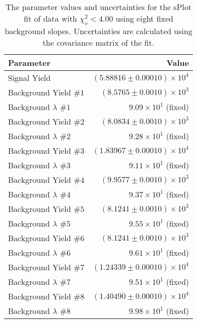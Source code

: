 
\begin{table}[ht]
    \begin{center}
        \begin{tabular}{lr}\toprule
            Parameter & Value \\\midrule
            Signal Yield & $(5.88816 \pm 0.00010) \times 10^{4}$ \\
            Background Yield $\#1$ & $(8.5765 \pm 0.0010) \times 10^{3}$ \\
            Background $\lambda$ $\#1$ & $9.09 \times 10^{1}$ (fixed) \\
            Background Yield $\#2$ & $(8.0834 \pm 0.0010) \times 10^{3}$ \\
            Background $\lambda$ $\#2$ & $9.28 \times 10^{1}$ (fixed) \\
            Background Yield $\#3$ & $(1.83967 \pm 0.00010) \times 10^{4}$ \\
            Background $\lambda$ $\#3$ & $9.11 \times 10^{1}$ (fixed) \\
            Background Yield $\#4$ & $(9.9577 \pm 0.0010) \times 10^{3}$ \\
            Background $\lambda$ $\#4$ & $9.37 \times 10^{1}$ (fixed) \\
            Background Yield $\#5$ & $(8.1241 \pm 0.0010) \times 10^{3}$ \\
            Background $\lambda$ $\#5$ & $9.55 \times 10^{1}$ (fixed) \\
            Background Yield $\#6$ & $(8.1241 \pm 0.0010) \times 10^{3}$ \\
            Background $\lambda$ $\#6$ & $9.61 \times 10^{1}$ (fixed) \\
            Background Yield $\#7$ & $(1.24339 \pm 0.00010) \times 10^{4}$ \\
            Background $\lambda$ $\#7$ & $9.51 \times 10^{1}$ (fixed) \\
            Background Yield $\#8$ & $(1.40490 \pm 0.00010) \times 10^{4}$ \\
            Background $\lambda$ $\#8$ & $9.98 \times 10^{1}$ (fixed) \\\bottomrule
        \end{tabular}
        \caption{The parameter values and uncertainties for the sPlot fit of data with $\chi^2_\nu < 4.00$ using eight fixed background slopes. Uncertainties are calculated using the covariance matrix of the fit.}\label{tab:splot-fit-results-chisqdof-4.00-fixed-8}
    \end{center}
\end{table}

